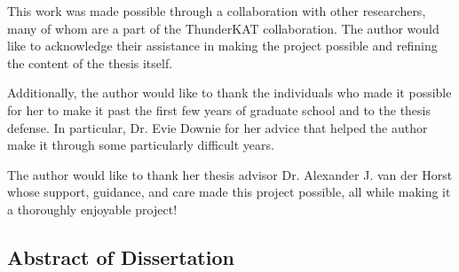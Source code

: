 \documentclass[12pt]{article}
\begin{document}
This work was made possible through a collaboration with other researchers, many of whom are a part of the ThunderKAT collaboration. The author would like to acknowledge their assistance in making the project possible and refining the content of the thesis itself. 

Additionally, the author would like to thank the individuals who made it possible for her to make it past the first few years of graduate school and to the thesis defense. In particular, Dr. Evie Downie for her advice that helped the author make it through some particularly difficult years. 

The author would like to thank her thesis advisor Dr. Alexander J. van der Horst whose support, guidance, and care made this project possible, all while making it a thoroughly enjoyable project! 
\newpage
\begin{center}
\section*{Abstract of Dissertation}
\end{center}
 \label{abstract}
\vspace*{-40pt}
\vspace{24pt}
\begin{singlespace}
\end{singlespace}
\vspace{-12pt}
\vspace*{24pt}
\end{document}
